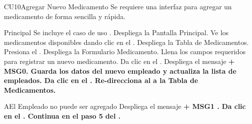 \begin{UseCase}{CU10}{Agregar Nuevo Medicamento}{
		Se requiere una interfaz para agregar un medicamento de forma sencilla y rápida.
	}
	\end{UseCase}
	\begin{UCtrayectoria}{Principal}
		\UCpaso Se incluye el caso de uso .
		\UCpaso Despliega la  {Pantalla Principal}.
		\UCpaso[\UCactor] Ve los medicamentos disponibles dando clic en el .
		\UCpaso Despliega la  {Tabla de Medicamentos}.
		\UCpaso[\UCactor] Presiona el .
		\UCpaso Despliega la  {Formulario Medicamento}.
		\UCpaso [\UCactor] Llena los campos requeridos para registrar un nuevo medicamento. 
		\UCpaso[\UCactor] Da clic en el  .
		\UCpaso Despliega el mensaje \bf {+ MSG0}. 
		\UCpaso Guarda los datos del nuevo empleado y actualiza la lista de empleados.
		\UCpaso[\UCactor] Da clic en el .
		\UCpaso Re-direcciona al \UCactor a la  {Tabla de Medicamentos}.
	
	\end{UCtrayectoria}


		\begin{UCtrayectoriaA}{A}{El Empleado no puede ser agregado}
			\UCpaso Despliega el mensaje \bf {+ MSG1 }.
			\UCpaso[\UCactor] Da clic en el .
			\UCpaso Continua en el paso 5 del .
		\end{UCtrayectoriaA}


